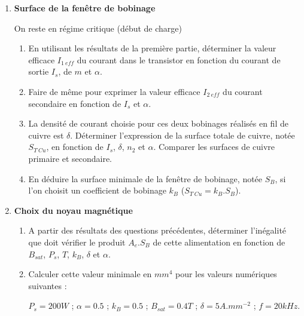 \begin{enumerate}
On se place en régime critique (début de charge)

\begin{enumerate}
\item Déterminer l’expression de l'induction maximale dans la ferrite en fonction de E, $\alpha$, T, $n_1$ et $A_e$, surface effective de cette ferrite.
\item En déduire l’expression de la valeur minimale $A_{e\ min}$ de cette ferrite pour empêcher toute saturation du matériau : on notera pour cela $B_{sat}$ la valeur de l’induction au voisinage de la saturation.
\end{enumerate}

\item \textbf{Surface de la fenêtre de bobinage}

On reste en régime critique (début de charge)

\begin{enumerate}
\item En utilisant les résultats de la première partie, déterminer la valeur efficace $I_{1\ eff}$ du courant dans le transistor en fonction du courant de sortie $I_s$, de $m$ et $\alpha$.
\item Faire de même pour exprimer la valeur efficace $I_{2\ eff}$ du courant secondaire en fonction de $I_s$ et $\alpha$.
\item La densité de courant choisie pour ces deux bobinages réalisés en fil de cuivre est $\delta$. Déterminer l'expression de la surface totale de cuivre, notée $S_{T\ Cu}$, en fonction de $I_s$, $\delta$, $n_2$ et $\alpha$. Comparer les surfaces de cuivre primaire et secondaire.
\item En déduire la surface minimale de la fenêtre de bobinage, notée $S_B$, si l’on choisit un coefficient de bobinage $k_B$ ($S_{T\ Cu} = k_B.S_B$).
\end{enumerate}

\item \textbf{Choix du noyau magnétique}

\begin{enumerate}
\item A partir des résultats des questions précédentes, déterminer l'inégalité que doit vérifier le produit $A_e.S_B$ de cette alimentation en fonction de $B_{sat}$, $P_s$, $T$, $k_B$, $\delta$ et $\alpha$.
\item Calculer cette valeur minimale en $mm^4$ pour les valeurs numériques suivantes :

\begin{center}
$P_s = 200 W$ ; $\alpha = 0.5$ ; $k_B = 0.5$ ; $B_{sat} = 0.4 T$ ; $\delta = 5 A.mm^{-2}$ ; $f = 20 kHz$.
\end{center}


\end{enumerate}
\end{enumerate}
